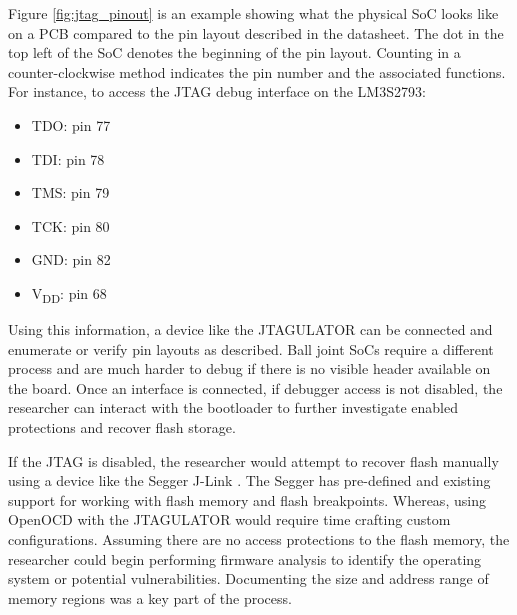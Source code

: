Figure \ref{fig:jtag_pinout} is an example showing what the physical SoC looks like on a PCB compared to the pin layout described in the datasheet. The dot in the top left of the SoC denotes the beginning of the pin layout. Counting in a counter-clockwise method indicates the pin number and the associated functions. For instance, to access the JTAG debug interface on the LM3S2793:

\begin{itemize}
  \item TDO: pin 77
  \item TDI: pin 78
  \item TMS: pin 79
  \item TCK: pin 80
  \item GND: pin 82
  \item V\textsubscript{DD}: pin 68
\end{itemize}

Using this information, a device like the JTAGULATOR \autocite{JTAGulator2023} can be connected and enumerate or verify pin layouts as described. Ball joint SoCs require a different process and are much harder to debug if there is no visible header available on the board. Once an interface is connected, if debugger access is not disabled, the researcher can interact with the bootloader to further investigate enabled protections and recover flash storage.

If the JTAG is disabled, the researcher would attempt to recover flash manually using a device like the Segger J-Link \autocite{SEGGERJLinkDebug}. The Segger has pre-defined and existing support for working with flash memory and flash breakpoints. Whereas, using OpenOCD with the JTAGULATOR would require time crafting custom configurations. Assuming there are no access protections to the flash memory, the researcher could begin performing firmware analysis to identify the operating system or potential vulnerabilities. Documenting the size and address range of memory regions was a key part of the process.